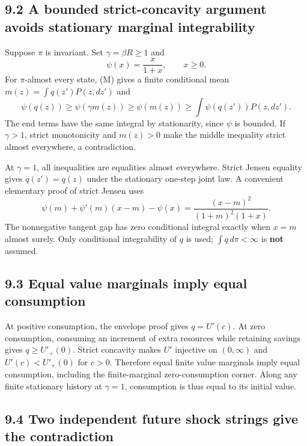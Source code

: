 \documentclass[
  11pt,
]{article}
\begin{document}
\subsection{9.2 A bounded strict-concavity argument avoids stationary
marginal
integrability}\label{a-bounded-strict-concavity-argument-avoids-stationary-marginal-integrability}

Suppose \(\pi\) is invariant. Set \(\gamma=\beta R\geq1\) and \[
\psi(x)=\frac{x}{1+x},\qquad x\geq0.
\] For \(\pi\)-almost every state, (M) gives a finite conditional mean
\(m(z)=\int q(z')P(z,dz')\) and \[
\psi(q(z))\geq\psi(\gamma m(z))\geq\psi(m(z))
\geq\int\psi(q(z'))P(z,dz').
\] The end terms have the same integral by stationarity, since \(\psi\)
is bounded. If \(\gamma>1\), strict monotonicity and \(m(z)>0\) make the
middle inequality strict almost everywhere, a contradiction.

At \(\gamma=1\), all inequalities are equalities almost everywhere.
Strict Jensen equality gives \(q(z')=q(z)\) under the stationary
one-step joint law. A convenient elementary proof of strict Jensen uses
\[
\psi(m)+\psi'(m)(x-m)-\psi(x)
=\frac{(x-m)^2}{(1+m)^2(1+x)}.
\] The nonnegative tangent gap has zero conditional integral exactly
when \(x=m\) almost surely. Only conditional integrability of \(q\) is
used; \(\int q\,d\pi<\infty\) is \textbf{not} assumed.

\subsection{9.3 Equal value marginals imply equal
consumption}\label{equal-value-marginals-imply-equal-consumption}

At positive consumption, the envelope proof gives \(q=U'(c)\). At zero
consumption, consuming an increment of extra resources while retaining
savings gives \(q\geq U'_+(0)\). Strict concavity makes \(U'\) injective
on \((0,\infty)\) and \(U'(c)<U'_+(0)\) for \(c>0\). Therefore equal
finite value marginals imply equal consumption, including the
finite-marginal zero-consumption corner. Along any finite stationary
history at \(\gamma=1\), consumption is thus equal to its initial value.

\subsection{9.4 Two independent future shock strings give the
contradiction}\label{two-independent-future-shock-strings-give-the-contradiction}
\end{document}
